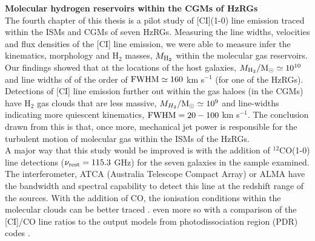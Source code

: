 \documentclass[10pt,a4paper]{article}
\begin{document}
{\bf Molecular hydrogen reservoirs within the CGMs of HzRGs}\\

The fourth chapter of this thesis is a pilot study of [CI](1-0) line emission traced within the ISMs and CGMs of seven HzRGs. Measuring the line widths, velocities and flux densities of the [CI] line emission, we were able to measure infer the kinematics, morphology and H$_2$ masses, $M_{\rm H_2}$ within the molecular gas reservoirs. Our findings showed that at the locations of the host galaxies, $M_{\rm H_2}/\rm{M}_\odot \simeq 10^{10}$ and line widths of of the order of $\rm FWHM \simeq 160$ km s$^{-1}$ (for one of the HzRGs). Detections of [CI] line emission further out within the gas haloes (in the CGMs) have H$_2$ gas clouds that are less massive, $M_{H_2}/\rm{M}_\odot \simeq 10^9$ and line-widths indicating more quiescent kinematics, $\rm FWHM=20 - 100$ km s$^{-1}.$ The conclusion drawn from this is that, once more, mechanical jet power is responsible for the turbulent motion of molecular gas within the ISMs of the HzRGs. \\

A major way that this study would be improved is with the addition of $^{12}$CO(1-0) line detections ($\nu_{\rm rest} =115.3$ GHz) for the seven galaxies in the sample examined. The interferometer, ATCA (Australia Telescope Compact Array) or ALMA have the bandwidth and spectral capability to detect this line at the redshift range of the sources. With the addition of CO, the ionisation conditions within the molecular clouds can be better traced \citep{Gullberg2016b,Emonts2018,Papadopoulos2018}. even more so with a comparison of the [CI]/CO line ratios to the output models from photodissociation region (PDR) codes \citep{Bothwell2017}. 



\end{document}
